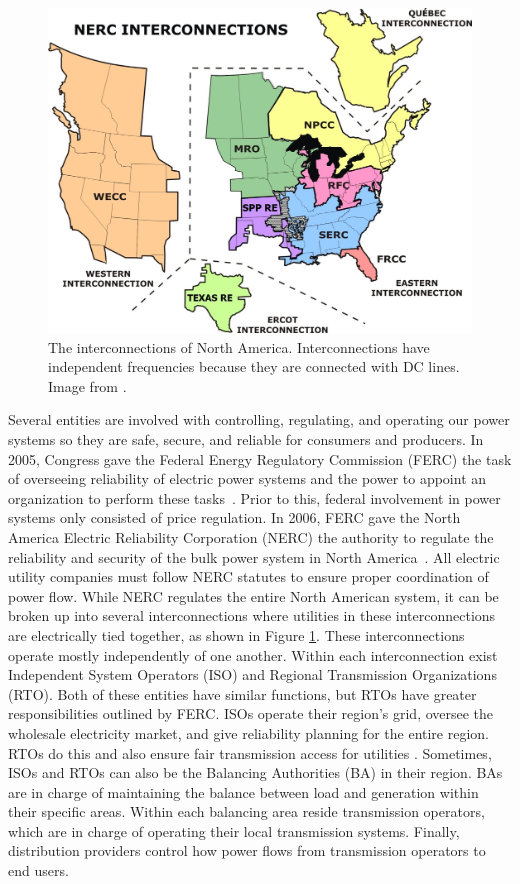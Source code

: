 \begin{figure}
\centering
\includegraphics[width=.7\textwidth]{figures/nerc_interconnections}
\caption{The interconnections of North America.  Interconnections have independent frequencies because they are connected with DC lines.  Image from \cite{nerc_image}.}
\label{interconnections}
\end{figure}

Several entities are involved with controlling, regulating, and operating our power systems so they are safe, secure, and reliable for consumers and producers.  In 2005, Congress gave the Federal Energy Regulatory Commission (FERC) the task of overseeing reliability of electric power systems and the power to appoint an organization to perform these tasks~\cite{ferc_215}.  Prior to this, federal involvement in power systems only consisted of price regulation.  In 2006, FERC gave the North America Electric Reliability Corporation (NERC) the authority to regulate the reliability and security of the bulk power system in North America~\cite{nerc}.  All electric utility companies must follow NERC statutes to ensure proper coordination of power flow.  While NERC regulates the entire North American system, it can be broken up into several interconnections where utilities in these interconnections are electrically tied together, as shown in Figure \ref{interconnections}.  These interconnections operate mostly independently of one another.  Within each interconnection exist Independent System Operators (ISO) and Regional Transmission Organizations (RTO).  Both of these entities have similar functions, but RTOs have greater responsibilities outlined by FERC.  ISOs operate their region's grid, oversee the wholesale electricity market, and give reliability planning for the entire region.  RTOs do this and also ensure fair transmission access for utilities \cite{doe_industry_primer}.  Sometimes, ISOs and RTOs can also be the Balancing Authorities (BA) in their region.  BAs are in charge of maintaining the balance between load and generation within their specific areas.  Within each balancing area reside transmission operators, which are in charge of operating their local transmission systems.  Finally, distribution providers control how power flows from transmission operators to end users.

